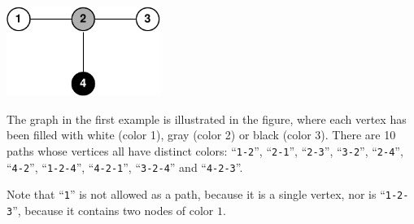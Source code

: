 \section*{}

\includegraphics[width=5cm]{pathsfig.pdf}

The graph in the first example is illustrated in the figure, where each vertex has been filled with white (color 1), gray (color 2) or black (color 3). There are 10 paths whose vertices all have distinct colors: ``\texttt{1-2}'', ``\texttt{2-1}'', ``\texttt{2-3}'', ``\texttt{3-2}'', ``\texttt{2-4}'', ``\texttt{4-2}'', ``\texttt{1-2-4}'', ``\texttt{4-2-1}'', ``\texttt{3-2-4}'' and ``\texttt{4-2-3}''.

Note that ``\texttt{1}'' is not allowed as a path, because it is a single vertex, nor is ``\texttt{1-2-3}'', because it contains two nodes of color $1$.
